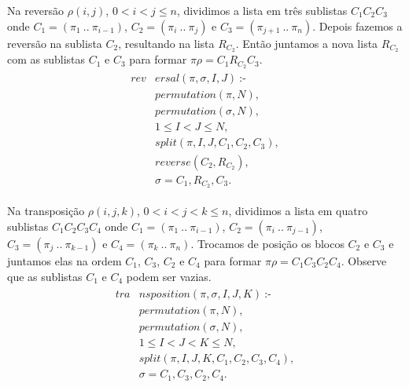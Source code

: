 Na reversão $\rho(i,j)$, $0 < i < j \leq n$, dividimos a lista em três
sublistas $C_{1}C_{2}C_{3}$ onde $C_{1} = (\pi_{1}~..~\pi_{i-1})$,
$C_{2} = (\pi_{i}~..~\pi_{j})$ e $C_{3} =
(\pi_{j+1}~..~\pi_{n})$. Depois fazemos a reversão na sublista
$C_{2}$, resultando na lista $R_{C_{2}}$. Então juntamos a nova lista
$R_{C_{2}}$ com as sublistas $C_{1}$ e $C_{3}$ para formar $\pi\rho =
C_{1}R_{C_{2}}C_{3}$.
\begin{align}
  \label{reversal}
  \begin{split}
  \textit{rev}&\textit{ersal}(\pi, \sigma, I, J)~\text{:-} \\
  &\textit{permutation}(\pi, N), \\
  &\textit{permutation}(\sigma, N),  \\
  &1 \le I < J \le N, \\
  &\textit{split}(\pi, I, J, C_{1}, C_{2}, C_{3}), \\
  &\textit{reverse}(C_{2}, R_{C_{2}}),  \\
  &\sigma = C_{1}, R_{C_{2}}, C_{3}. 
  \end{split}
\end{align}

Na transposição $\rho(i,j,k)$, $0 < i < j < k\leq n$, dividimos a
lista em quatro sublistas $C_{1}C_{2}C_{3}C_{4}$ onde $C_{1} =
(\pi_{1}~..~\pi_{i-1})$, $C_{2} = (\pi_{i}~..~\pi_{j-1})$, $C_{3} =
(\pi_{j}~..~\pi_{k-1})$ e $C_{4} = (\pi_{k}~..~\pi_{n})$. Trocamos de
posição os blocos $C_{2}$ e $C_{3}$ e juntamos elas na ordem $C_{1}$,
$C_{3}$, $C_{2}$ e $C_{4}$ para formar $\pi\rho =
C_{1}C_{3}C_{2}C_{4}$. Observe que as sublistas $C_{1}$ e $C_{4}$
podem ser vazias.
\begin{align}
  \label{transposition}
  \begin{split}
  \textit{tra}&\textit{nsposition}(\pi, \sigma, I, J, K)~\text{:-} \\
  &\textit{permutation}(\pi, N), \\
  &\textit{permutation}(\sigma, N), \\
  &1 \le I < J < K \le N,  \\
  &\textit{split}(\pi, I, J, K, C_{1}, C_{2}, C_{3}, C_{4}), \\
  &\sigma = C_{1}, C_{3}, C_{2}, C_{4}. 
  \end{split}
\end{align}

